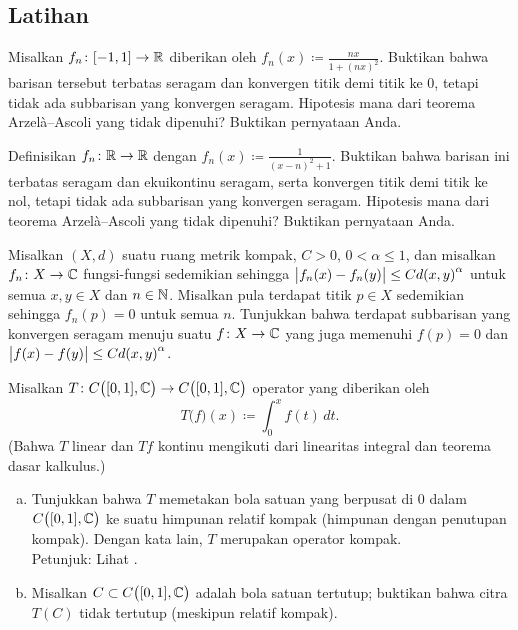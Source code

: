\subsection{Latihan}

\begin{exercise}
Misalkan $f_n \colon [-1,1] \to {\mathbb{R}}$ diberikan oleh $f_n(x) \coloneqq \frac{nx}{1+{(nx)}^2}$.
Buktikan bahwa barisan tersebut terbatas seragam dan konvergen titik demi titik ke 0,
tetapi tidak ada
subbarisan yang konvergen seragam.
Hipotesis mana dari teorema Arzel\`a--Ascoli
yang tidak dipenuhi?  Buktikan pernyataan Anda.
\end{exercise}

\begin{exercise}
Definisikan $f_n \colon {\mathbb{R}} \to {\mathbb{R}}$ dengan $f_n(x) \coloneqq \frac{1}{{(x-n)}^2+1}$.  Buktikan bahwa
barisan ini terbatas seragam dan ekuikontinu seragam, serta
konvergen titik demi titik ke nol, tetapi tidak ada
subbarisan yang konvergen seragam.
Hipotesis mana dari teorema Arzel\`a--Ascoli
yang tidak dipenuhi?  Buktikan pernyataan Anda.
\end{exercise}

\begin{exercise}
Misalkan $(X,d)$ suatu ruang metrik kompak, $C > 0$, $0 < \alpha \leq 1$, dan
misalkan $f_n \colon X \to {\mathbb{C}}$ fungsi-fungsi sedemikian sehingga
$\bigl\lvert {f_n(x)-f_n(y)} \bigr\rvert \leq C {d(x,y)}^\alpha$ untuk semua $x,y \in X$ dan
$n \in {\mathbb{N}}$.  Misalkan pula terdapat titik $p \in X$ sedemikian sehingga
$f_n(p) = 0$ untuk semua $n$.
Tunjukkan bahwa terdapat subbarisan yang konvergen seragam menuju
suatu $f \colon X \to {\mathbb{C}}$ yang juga memenuhi $f(p) = 0$ dan
$\bigl\lvert {f(x)-f(y)} \bigr\rvert \leq C {d(x,y)}^\alpha$.
\end{exercise}

\begin{exercise}
Misalkan $T \colon C\bigl([0,1],{\mathbb{C}}\bigr) \to C\bigl([0,1],{\mathbb{C}}\bigr)$ operator yang
diberikan oleh
\begin{equation*}
T\bigl(f\bigr) (x) \coloneqq \int_0^x f(t)\, dt .
\end{equation*}
(Bahwa $T$ linear dan $Tf$ kontinu mengikuti dari
linearitas integral dan
teorema dasar kalkulus.)
\begin{enumerate}[a)]
\item
Tunjukkan bahwa $T$ memetakan bola satuan yang berpusat di 0 dalam $C\bigl([0,1],{\mathbb{C}}\bigr)$ ke suatu
himpunan relatif kompak (himpunan dengan penutupan kompak).
Dengan kata lain, $T$ merupakan operator kompak.\\
Petunjuk: Lihat .
\item
Misalkan $C \subset C\bigl([0,1],{\mathbb{C}}\bigr)$ adalah bola satuan tertutup;
buktikan bahwa
citra $T(C)$ tidak tertutup (meskipun relatif kompak).
\end{enumerate}
\end{exercise}

